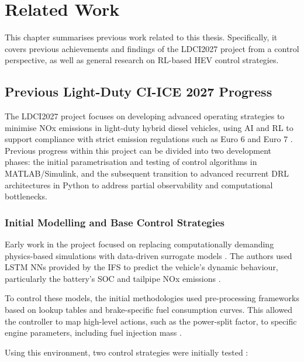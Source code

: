 \chapter{Related Work}
\label{chap:related_work}

This chapter summarises previous work related to this thesis. Specifically, it covers previous achievements and findings of the \ac{LDCI2027} project from a control perspective, as well as general research on \ac{RL}-based \ac{HEV} control strategies.

\section{Previous Light-Duty CI-ICE 2027 Progress}
The \ac{LDCI2027} project focuses on developing advanced operating strategies to minimise \ac{NOx} emissions in light-duty hybrid diesel vehicles, using \ac{AI} and \ac{RL} to support compliance with strict emission regulations such as Euro 6 and Euro 7 \cite{european_union_regulation_2007, european_union_regulation_2024}. Previous progress within this project can be divided into two development phases: the initial parametrisation and testing of control algorithms in MATLAB/Simulink, and the subsequent transition to advanced recurrent \ac{DRL} architectures in Python to address partial observability and computational bottlenecks.

\subsection{Initial Modelling and Base Control Strategies}
\label{subsec:initial_modelling_base_control}
Early work in the project focused on replacing computationally demanding physics-based simulations with data-driven surrogate models \cite{universitat_politecnica_de_catalunya_development_2025}. The authors used \ac{LSTM} \ac{NN}s provided by the \ac{IFS} to predict the vehicle's dynamic behaviour, particularly the battery's \ac{SOC} and tailpipe \ac{NOx} emissions \cite{cuberos_munoz_developing_2025}.

To control these models, the initial methodologies used pre-processing frameworks based on lookup tables and brake-specific fuel consumption curves. This allowed the controller to map high-level actions, such as the power-split factor, to specific engine parameters, including fuel injection mass \cite{cuberos_munoz_developing_2025}.

Using this environment, two control strategies were initially tested \cite{cuberos_munoz_developing_2025}:

